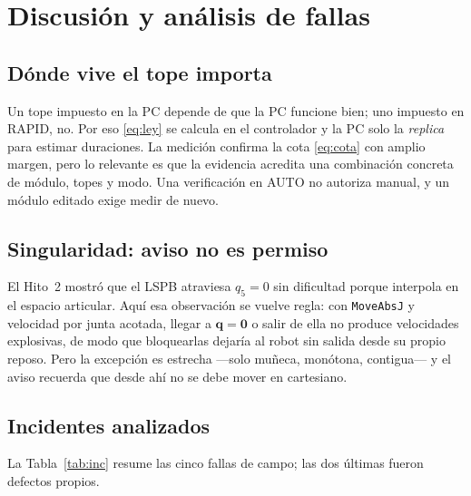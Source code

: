 \documentclass[conference]{IEEEtran}
\begin{document}
\section{Discusión y análisis de fallas}
\label{sec:inc}

\subsection{Dónde vive el tope importa}

Un tope impuesto en la PC depende de que la PC funcione bien; uno
impuesto en RAPID, no. Por eso \eqref{eq:ley} se calcula en el
controlador y la PC solo la \emph{replica} para estimar duraciones. La
medición confirma la cota \eqref{eq:cota} con amplio margen, pero lo
relevante es que la evidencia acredita una combinación concreta de
módulo, topes y modo. Una verificación en AUTO no autoriza manual, y un
módulo editado exige medir de nuevo.

\subsection{Singularidad: aviso no es permiso}

El Hito~2 mostró que el LSPB atraviesa $q_5=0$ sin dificultad porque
interpola en el espacio articular. Aquí esa observación se vuelve
regla: con \texttt{MoveAbsJ} y velocidad por junta acotada, llegar a
$\bm q=\bm 0$ o salir de ella no produce velocidades explosivas, de modo
que bloquearlas dejaría al robot sin salida desde su propio reposo. Pero
la excepción es estrecha ---solo muñeca, monótona, contigua--- y
el aviso recuerda que desde ahí no se debe mover en cartesiano.

\subsection{Incidentes analizados}

La Tabla~\ref{tab:inc} resume las cinco fallas de campo; las dos
últimas fueron defectos propios.
\end{document}
